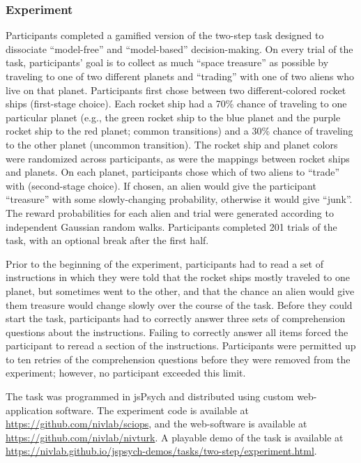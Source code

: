 \documentclass[a4paper,notitlepage,12pt]{article}
\begin{document}
\begin{refsection}[supp]
\subsubsection*{Experiment}

Participants completed a gamified version of the two-step task \cite{daw2011model} designed to dissociate ``model-free'' and ``model-based'' decision-making. On every trial of the task, participants' goal is to collect as much ``space treasure'' as possible by traveling to one of two different planets and ``trading'' with one of two aliens who live on that planet. Participants first chose between two different-colored rocket ships (first-stage choice). Each rocket ship had a 70\% chance of traveling to one particular planet (e.g., the green rocket ship to the blue planet and the purple rocket ship to the red planet; common transitions) and a 30\% chance of traveling to the other planet (uncommon transition). The rocket ship and planet colors were randomized across participants, as were the mappings between rocket ships and planets. On each planet, participants chose which of two aliens to ``trade'' with (second-stage choice). If chosen, an alien would give the participant ``treasure'' with some slowly-changing probability, otherwise it would give ``junk''. The reward probabilities for each alien and trial were generated according to independent Gaussian random walks. Participants completed 201 trials of the task, with an optional break after the first half. 

Prior to the beginning of the experiment, participants had to read a set of instructions in which they were told that the rocket ships mostly traveled to one planet, but sometimes went to the other, and that the chance an alien would give them treasure would change slowly over the course of the task. Before they could start the task, participants had to correctly answer three sets of comprehension questions about the instructions. Failing to correctly answer all items forced the participant to reread a section of the instructions. Participants were permitted up to ten retries of the comprehension questions before they were removed from the experiment; however, no participant exceeded this limit. 

The task was programmed in jsPsych \cite{deleeuw_2015_jspsych-2} and distributed using custom web-application software. The experiment code is available at \url{https://github.com/nivlab/sciops}, and the web-software is available at \url{https://github.com/nivlab/nivturk}. A playable demo of the task is available at \url{https://nivlab.github.io/jspsych-demos/tasks/two-step/experiment.html}.


\end{refsection}
\end{document}
